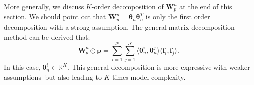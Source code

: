 \documentclass[conference]{IEEEtran}
\newcommand{\bs}{\boldsymbol}
\newcommand{\bW}{\bs{W}}
\newcommand{\bl}{\bs{l}}
\newcommand{\bz}{\bs{z}}
\newcommand{\bp}{\bs{p}}
\newcommand{\bx}{\bs{x}}
\newcommand{\Bf}{\bs{f}}
\newcommand{\mR}{\mathbb{R}}
\begin{document}
%
%



More generally, we discuss $K$-order decomposition of $\bW_p^n$ at the end of this section. We should point out that $\bW_p^n = \bs\theta_n \bs\theta_n^T$ is only the first order decomposition with a strong assumption. The general matrix decomposition method can be derived that:
\begin{equation}
\bW_p^n \odot \bp = \sum_{i=1}^N {\sum_{j=1}^N \langle \bs\theta_n^i, \bs\theta_n^j\rangle \langle \Bf_i, \Bf_j \rangle}.
\end{equation}
In this case, $\bs\theta_n^i \in \mR^K$. This general decomposition is more expressive with weaker assumptions, but also leading to $K$ times model complexity.
\end{document}
